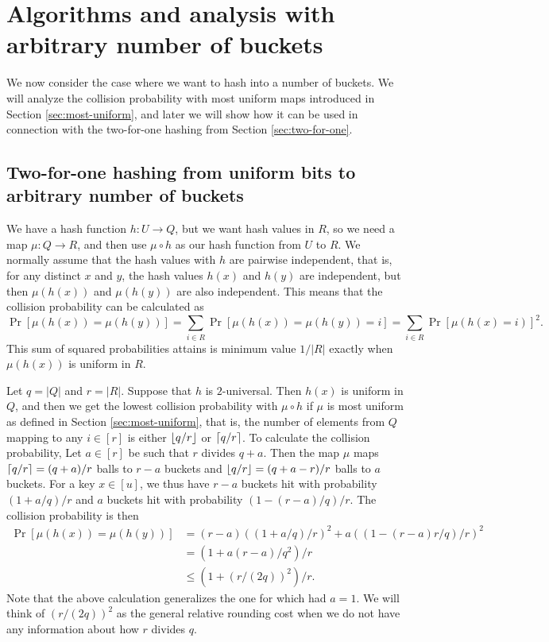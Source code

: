 
\section{Algorithms and analysis with arbitrary number of buckets}\label{sec:arbitrary-buckets}
We now consider the case where we want to hash into
a number of buckets. We will analyze the collision probability
with most uniform maps introduced in Section \ref{sec:most-uniform},
and later we will show how it can be used in connection with the
two-for-one hashing from Section \ref{sec:two-for-one}.

\subsection{Two-for-one hashing from uniform bits to arbitrary number of buckets}
We have a hash function $h:U\to Q$, but we want hash values in $R$, so
we need a map $\mu:Q\to R$, and then use $\mu\circ h$ as
our hash function from $U$ to $R$. We normally assume that the hash values 
with $h$ are pairwise independent, that is, for any distinct $x$ and $y$,
the hash values $h(x)$ and $h(y)$ are independent, but then 
$\mu(h(x))$ and $\mu(h(y))$ are also independent. This means
that the collision probability can be calculated
as 
\[\Pr[\mu(h(x))=\mu(h(y))]=\sum_{i\in R}\Pr[\mu(h(x))=\mu(h(y))=i]=\sum_{i\in R}\Pr[\mu(h(x)=i)]^2.\]
This sum of squared probabilities attains is minimum value $1/|R|$
exactly when $\mu(h(x))$ is uniform in $R$. 

Let $q=|Q|$ and $r=|R|$. Suppose that $h$ is $2$-universal. Then
$h(x)$ is uniform in $Q$, and then we get the lowest collision
probability with $\mu\circ h$ if $\mu$ is most uniform as defined in
Section \ref{sec:most-uniform}, that is, the number of elements from
$Q$ mapping to any $i\in[r]$ is either $\lfloor {q/r} \rfloor$ or
$\lceil {q/r}\rceil$. To calculate the collision probability,
Let $a\in[r]$ be such that $r$ divides $q+a$. Then the map $\mu$ maps
$\lceil {q/r}\rceil=(q+a)/r$ balls to $r-a$ buckets and
$\lfloor {q/r} \rfloor=(q+a-r)/r$ balls to $a$ buckets. For a key $x\in [u]$, we
thus have $r-a$ buckets hit with probability $(1+a/q)/r$ and
$a$ buckets hit with probability $(1-(r-a)/q)/r$.
The collision probability is then
\begin{equation}\begin{split}
   \Pr[\mu(h(x))=\mu(h(y))]
                  &= (r-a)((1+a/q)/r)^2+a((1-(r-a)r/q)/r)^2
                 \\&=(1+a(r-a)/q^2)/r
                 \\&\le \left(1+(r/(2q))^2\right)/r.\label{eq:coll-a}
\end{split}\end{equation}
Note that the above calculation generalizes the one for  which
had $a=1$. We will think of $(r/(2q))^2$ as the general relative rounding
cost when we do not have any information about how $r$ divides $q$.

